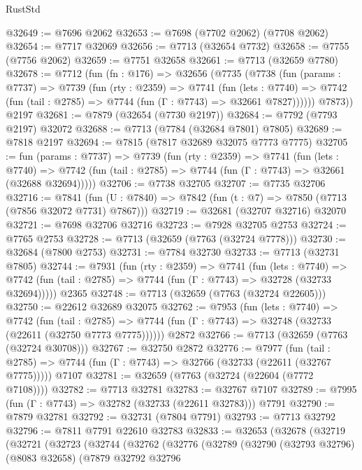 \begin{lexlean}{RustStd}
\begin{coremodule}
@32649 := @7696 @2062
@32653 := @7698 (@7702 @2062) (@7708 @2062)
@32654 := @7717 @32069
@32656 := @7713 (@32654 @7732)
@32658 := @7755 (@7756 @2062)
@32659 := @7751 @32658
@32661 := @7713 (@32659 @7780)
@32678 := @7712
    (fun (fn : @176) =>
    @32656
      (@7735
        (@7738
          (fun (params : @7737) =>
          @7739
            (fun (rty : @2359) =>
            @7741
              (fun (lets : @7740) =>
              @7742 (fun (tail : @2785) => @7744 (fun (Γ : @7743) => @32661 @7827))))))
        @7873))
    @2197
@32681 := @7879 (@32654 (@7730 @2197))
@32684 := @7792 (@7793 @2197) @32072
@32688 := @7713 (@7784 (@32684 @7801) @7805)
@32689 := @7818 @2197
@32694 := @7815 (@7817 @32689 @32075 @7773 @7775)
@32705 := fun (params : @7737) =>
  @7739
    (fun (rty : @2359) =>
    @7741
      (fun (lets : @7740) =>
      @7742 (fun (tail : @2785) => @7744 (fun (Γ : @7743) => @32661 (@32688 @32694)))))
@32706 := @7738 @32705
@32707 := @7735 @32706
@32716 := @7841
    (fun (U : @7840) => @7842 (fun (t : @7) => @7850 (@7713 (@7856 @32072 @7731) @7867)))
@32719 := @32681 (@32707 @32716) @32070
@32721 := @7698 @32706 @32716
@32723 := @7928 @32705 @2753
@32724 := @7765 @2753
@32728 := @7713 (@32659 (@7763 (@32724 @7778)))
@32730 := @32684 (@7800 @2753)
@32731 := @7784 @32730
@32733 := @7713 (@32731 @7805)
@32744 := @7931
    (fun (rty : @2359) =>
    @7741
      (fun (lets : @7740) =>
      @7742 (fun (tail : @2785) => @7744 (fun (Γ : @7743) => @32728 (@32733 @32694)))))
    @2365
@32748 := @7713 (@32659 (@7763 (@32724 @22605)))
@32750 := @22612 @32689 @32075
@32762 := @7953
    (fun (lets : @7740) =>
    @7742
      (fun (tail : @2785) =>
      @7744 (fun (Γ : @7743) => @32748 (@32733 (@22611 (@32750 @7773 @7775))))))
    @2872
@32766 := @7713 (@32659 (@7763 (@32724 @30708)))
@32767 := @32750 @2872
@32776 := @7977
    (fun (tail : @2785) => @7744 (fun (Γ : @7743) => @32766 (@32733 (@22611 (@32767 @7775)))))
    @7107
@32781 := @32659 (@7763 (@32724 (@22604 (@7772 @7108))))
@32782 := @7713 @32781
@32783 := @32767 @7107
@32789 := @7995 (fun (Γ : @7743) => @32782 (@32733 (@22611 @32783))) @7791
@32790 := @7879 @32781
@32792 := @32731 (@7804 @7791)
@32793 := @7713 @32792
@32796 := @7811 @7791 @22610 @32783
@32833 := @32653
    (@32678
      (@32719
        (@32721
          (@32723
            (@32744
              (@32762
                (@32776
                  (@32789
                    (@32790
                      (@32793 @32796)
                      (@8083 @32658)
                      (@7879
                        @32792
                        @32796

\end{coremodule}
\end{lexlean}
